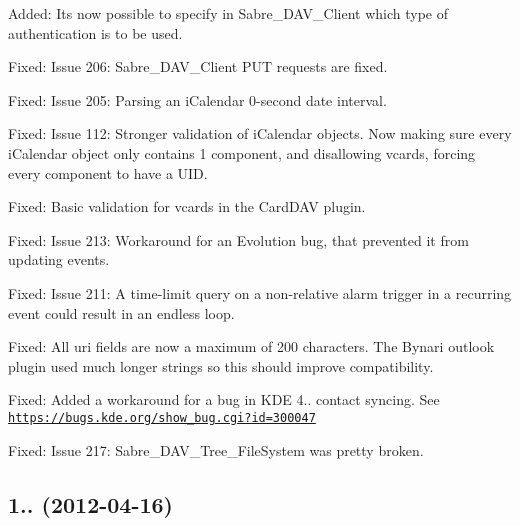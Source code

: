 \begin{DoxyItemize}
\item Added\+: It\textquotesingle{}s now possible to specify in Sabre\+\_\+\+D\+A\+V\+\_\+\+Client which type of authentication is to be used.
\item Fixed\+: Issue 206\+: Sabre\+\_\+\+D\+A\+V\+\_\+\+Client P\+UT requests are fixed.
\item Fixed\+: Issue 205\+: Parsing an i\+Calendar 0-\/second date interval.
\item Fixed\+: Issue 112\+: Stronger validation of i\+Calendar objects. Now making sure every i\+Calendar object only contains 1 component, and disallowing vcards, forcing every component to have a U\+ID.
\item Fixed\+: Basic validation for vcards in the Card\+D\+AV plugin.
\item Fixed\+: Issue 213\+: Workaround for an Evolution bug, that prevented it from updating events.
\item Fixed\+: Issue 211\+: A time-\/limit query on a non-\/relative alarm trigger in a recurring event could result in an endless loop.
\item Fixed\+: All uri fields are now a maximum of 200 characters. The Bynari outlook plugin used much longer strings so this should improve compatibility.
\item Fixed\+: Added a workaround for a bug in K\+DE 4.. contact syncing. See \href{https://bugs.kde.org/show_bug.cgi?id=300047}{\tt https\+://bugs.\+kde.\+org/show\+\_\+bug.\+cgi?id=300047}
\item Fixed\+: Issue 217\+: Sabre\+\_\+\+D\+A\+V\+\_\+\+Tree\+\_\+\+File\+System was pretty broken.
\end{DoxyItemize}

\subsection*{1.. (2012-\/04-\/16) }



